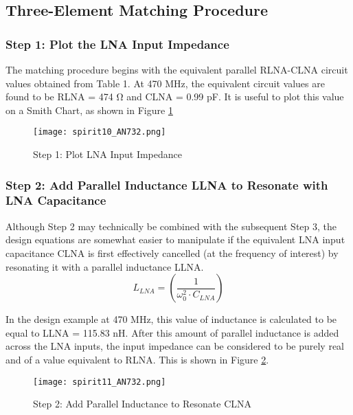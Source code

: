     \subsection{Three-Element Matching Procedure}
      \subsubsection{Step 1: Plot the LNA Input Impedance}
        The matching procedure begins with the equivalent parallel RLNA-CLNA circuit values 
        obtained from Table 1. At 470 MHz, the equivalent circuit values are found to be RLNA = 474 
        Ω and CLNA = 0.99 pF. It is useful to plot this value on a Smith Chart, as shown in Figure 
        \ref{EXP001:fig_spirit10}
        \begin{figure}[ht!]  %
          \centering
          \texttt{[image: spirit10\_AN732.png]}
          \caption{Step 1: Plot LNA Input Impedance \cite[s.~6]{AN643SiliconLabs}}
          \label{EXP001:fig_spirit10}
        \end{figure}
        
      \subsubsection{Step 2: Add Parallel Inductance LLNA to Resonate with LNA Capacitance}
        Although Step 2 may technically be combined with the subsequent Step 3, the design 
        equations are somewhat easier to manipulate if the equivalent LNA input capacitance CLNA is 
        first effectively cancelled (at the frequency of interest) by resonating it with a parallel 
        inductance LLNA.
        \begin{equation}\label{EXP001:eq_spirit12}
          L_{LNA} = \left(\frac{1}{\omega_0^2\cdot C_{LNA}}\right)
        \end{equation}
        
        In the design example at 470 MHz, this value of inductance is calculated to be equal to 
        LLNA = 115.83 nH. After this amount of parallel inductance is added across the LNA inputs, 
        the input impedance can be considered to be purely real and of a value equivalent to RLNA. 
        This is shown in Figure 
        \ref{EXP001:fig_spirit11}.
        
        \begin{figure}[ht!]  %
          \centering
          \texttt{[image: spirit11\_AN732.png]}
          \caption{Step 2: Add Parallel Inductance to Resonate CLNA \cite[s.~7]{AN643SiliconLabs}}
          \label{EXP001:fig_spirit11}
        \end{figure}
        
